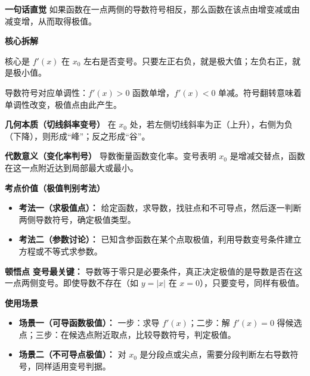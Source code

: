 \begin{explanationbox}
	\textbf{\textcolor{CExplanation}{一句话直觉}}
	如果函数在一点两侧的导数符号相反，那么函数在该点由增变减或由减变增，从而取得极值。

	\medskip
	\textbf{\textcolor{CExplanation}{核心拆解}}
	\begin{description}[style=nextline, leftmargin=2.8em, labelsep=0.5em, itemsep=0.45em]
		\item[\textbf{要点一（符号判据）：}]
			核心是 $f'(x)$ 在 $x_0$ 左右是否变号。只要左正右负，就是极大值；左负右正，就是极小值。
		\item[\textbf{要点二（单调性反转）：}]
			导数符号对应单调性：$f'(x)>0$ 函数单增，$f'(x)<0$ 单减。符号翻转意味着单调性改变，极值点由此产生。
	\end{description}

	\medskip
	\textbf{\textcolor{CExplanation}{几何本质（切线斜率变号）}}
	在 $x_0$ 处，若左侧切线斜率为正（上升），右侧为负（下降），则形成“峰”；反之形成“谷”。

	\medskip
	\textbf{\textcolor{CExplanation}{代数意义（变化率判号）}}
	导数衡量函数变化率。变号表明 $x_0$ 是增减交替点，函数在这一点附近达到局部最大或最小。

	\medskip
	\textbf{\textcolor{CExplanation}{考点价值（极值判别考法）}}
	\begin{itemize}[leftmargin=*, itemsep=0.5em, topsep=0.4em]
		\item \textbf{考法一（求极值点）：} 给定函数，求导数，找驻点和不可导点，然后逐一判断两侧导数符号，确定极值类型。
		\item \textbf{考法二（参数讨论）：} 已知含参函数在某个点取极值，利用导数变号条件建立方程或不等式求参数。
	\end{itemize}

	\medskip
	\textbf{\textcolor{CExplanation}{顿悟点}}
	\textbf{变号最关键：} 导数等于零只是必要条件，真正决定极值的是导数是否在这一点两侧变号。即使导数不存在（如 $y=|x|$ 在 $x=0$），只要变号，同样有极值。

	\medskip
	\textbf{\textcolor{CExplanation}{使用场景}}
	\begin{itemize}[leftmargin=*, itemsep=0.5em, topsep=0.4em]
		\item \textbf{场景一（可导函数极值）：} 一步：求导 $f'(x)$；二步：解 $f'(x)=0$ 得候选点；三步：在候选点附近取点，比较导数符号，判定极值。
		\item \textbf{场景二（不可导点极值）：} 对 $x_0$ 是分段点或尖点，需要分段判断左右导数符号，同样适用变号判据。
	\end{itemize}

\end{explanationbox}
